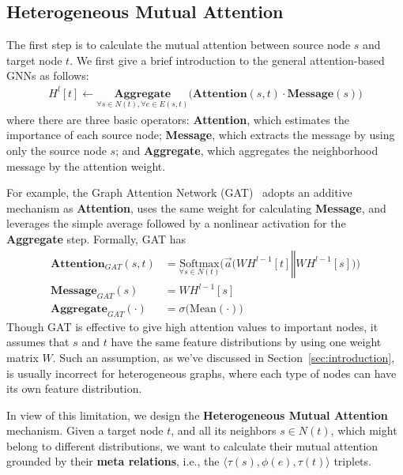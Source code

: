 \documentclass[sigconf]{acmart}
\theoremstyle{definition}
\begin{document}
\subsection{Heterogeneous Mutual Attention}

The first step is to calculate the mutual attention between source node $s$ and target node $t$. We first give a brief introduction to the general attention-based GNNs as follows: 
\begin{align}
H^{l}[t] \gets \underset{\forall s \in N(t), \forall e \in E(s,t)}{\textbf{Aggregate}}\Big(  \textbf{Attention}(s, t) \cdot \textbf{Message}(s)\Big)
\end{align}
where there are three basic operators: \textbf{Attention}, which estimates the importance of each source node; \textbf{Message}, which extracts the message by using only the source node $s$; and \textbf{Aggregate}, which aggregates the neighborhood message by the attention weight. 



For example, the Graph Attention Network (GAT)~\cite{gat} adopts an additive mechanism as \textbf{Attention}, uses the same weight for calculating \textbf{Message}, and leverages the simple average followed by a nonlinear activation for the \textbf{Aggregate} step. 
Formally, GAT has
\begin{align}
    \textbf{Attention}_{GAT}(s, t) & = \underset{\forall s \in N(t)}{\text{Softmax}} \bigg(\Vec{a} \Big(WH^{l-1}[t] \mathbin\Vert WH^{l-1}[s]\Big)\bigg) \nonumber\\
    \textbf{Message}_{GAT}(s)  & = WH^{l-1}[s] \nonumber\\ 
    \textbf{Aggregate}_{GAT}(\cdot) & = \sigma \Big(\text{Mean}(\cdot)\Big) \nonumber
\end{align}
Though GAT is effective to give high attention values to important nodes, it assumes that $s$ and $t$ have the same feature distributions by using one weight matrix $W$. 
Such an assumption, as we've discussed in Section~\ref{sec:introduction}, 
is usually incorrect for heterogeneous graphs, where each type of nodes can have its own feature distribution. 


In view of this limitation, we design the \textbf{Heterogeneous Mutual Attention} mechanism. 
Given a target node $t$, and all its neighbors $s \in N(t)$, which might belong to different distributions, we want to calculate their mutual attention grounded by their \textbf{meta relations}, i.e., the $\langle \tau(s), \phi(e), \tau(t) \rangle$ triplets. 
\end{document}
